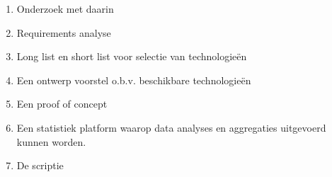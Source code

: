 \begin{enumerate}
    \item Onderzoek met daarin
    \item Requirements analyse
    \item Long list en short list voor selectie van technologieën
    \item Een ontwerp voorstel o.b.v. beschikbare technologieën
    \item Een proof of concept
    \item Een statistiek platform waarop data analyses en aggregaties uitgevoerd kunnen worden.
    \item De scriptie
\end{enumerate}



